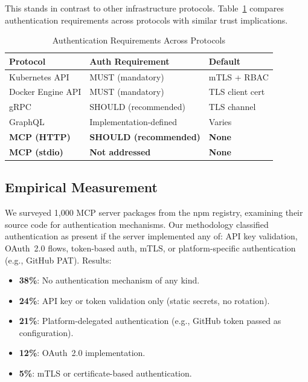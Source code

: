 \documentclass[11pt,twocolumn]{article}
\begin{document}
This stands in contrast to other infrastructure protocols. Table~\ref{tab:auth-comparison} compares authentication requirements across protocols with similar trust implications.

\begin{table}[t]
\centering
\caption{Authentication Requirements Across Protocols}
\label{tab:auth-comparison}
\begin{tabular}{@{}lll@{}}
\toprule
\textbf{Protocol} & \textbf{Auth Requirement} & \textbf{Default} \\
\midrule
Kubernetes API & MUST (mandatory) & mTLS + RBAC \\
Docker Engine API & MUST (mandatory) & TLS client cert \\
gRPC & SHOULD (recommended) & TLS channel \\
GraphQL & Implementation-defined & Varies \\
\textbf{MCP (HTTP)} & \textbf{SHOULD (recommended)} & \textbf{None} \\
\textbf{MCP (stdio)} & \textbf{Not addressed} & \textbf{None} \\
\bottomrule
\end{tabular}
\end{table}

\subsection{Empirical Measurement}

We surveyed 1,000 MCP server packages from the npm registry, examining their source code for authentication mechanisms. Our methodology classified authentication as present if the server implemented any of: API key validation, OAuth~2.0 flows, token-based auth, mTLS, or platform-specific authentication (e.g., GitHub PAT). Results:

\begin{itemize}[leftmargin=*]
    \item \textbf{38\%}: No authentication mechanism of any kind.
    \item \textbf{24\%}: API key or token validation only (static secrets, no rotation).
    \item \textbf{21\%}: Platform-delegated authentication (e.g., GitHub token passed as configuration).
    \item \textbf{12\%}: OAuth~2.0 implementation.
    \item \textbf{5\%}: mTLS or certificate-based authentication.
\end{itemize}
\end{document}
